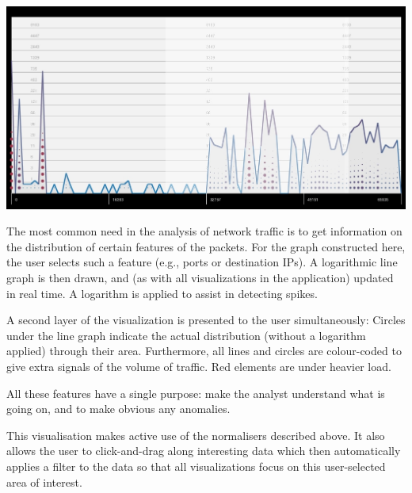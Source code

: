 \includegraphics[width=\linewidth]{materials/distribution.jpg}

The most common need in the analysis of network traffic is to get information on the distribution of certain features of the packets. For the graph constructed here, the user selects such a feature (e.g., ports or destination IPs). A logarithmic line graph is then drawn, and (as with all visualizations in the application) updated in real time. A logarithm is applied to assist in detecting spikes.

A second layer of the visualization is presented to the user simultaneously: Circles under the line graph indicate the actual distribution (without a logarithm applied) through their area. Furthermore, all lines and circles are colour-coded to give extra signals of the volume of traffic. Red elements are under heavier load.

All these features have a single purpose: make the analyst understand what is going on, and to make obvious any anomalies.

This visualisation makes active use of the normalisers described above. It also allows the user to click-and-drag along interesting data which then automatically applies a filter to the data so that all visualizations focus on this user-selected area of interest.
